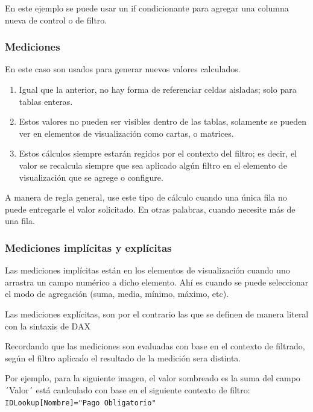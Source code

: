 En este ejemplo se puede usar un if condicionante para agregar una columna nueva de control o de filtro.


\subsubsection{Mediciones}

En este caso son usados para generar nuevos valores calculados.

\begin{enumerate}
    \item Igual que la anterior, no hay forma de referenciar celdas aisladas; solo para tablas enteras.
    \item Estos valores no pueden ser visibles dentro de las tablas, solamente se pueden ver en elementos de visualización como cartas, o matrices.
    \item Estos cálculos siempre estarán regidos por el contexto del filtro; es decir, el valor se recalcula siempre que sea aplicado algún filtro en el elemento de visualización que se agrege o configure.
\end{enumerate}

A manera de regla general, use este tipo de cálculo cuando una única fila no puede entregarle el valor solicitado. En otras palabras, cuando necesite más de una fila.

\subsubsection{Mediciones implícitas y explícitas}

Las mediciones implícitas están en los elementos de visualización cuando uno arrastra un campo numérico a dicho elemento. Ahí es cuando se puede seleccionar el modo de agregación (suma, media, mínimo, máximo, etc).

Las mediciones explícitas, son por el contrario las que se definen de manera literal con la sintaxis de DAX

Recordando que las mediciones son evaluadas con base en el contexto de filtrado, según el filtro aplicado el resultado de la medición sera distinta. 

Por ejemplo, para la siguiente imagen, el valor sombreado es la suma del campo ´Valor´ está canlculado con base en el siguiente contexto de filtro: \texttt{IDLookup[Nombre]="Pago Obligatorio"}

